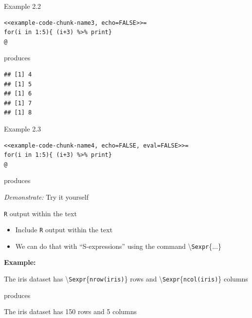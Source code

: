 \documentclass[10pt]{beamer}\usepackage[]{graphicx}\usepackage[]{color}
\makeatletter
\newenvironment{kframe}{%
 \def\at@end@of@kframe{}%
 \ifinner\ifhmode%
  \def\at@end@of@kframe{\end{minipage}}%
  \begin{minipage}{\columnwidth}%
 \fi\fi%
 \def\FrameCommand##1{\hskip\@totalleftmargin \hskip-\fboxsep
 \colorbox{shadecolor}{##1}\hskip-\fboxsep
     \hskip-\linewidth \hskip-\@totalleftmargin \hskip\columnwidth}%
 \MakeFramed {\advance\hsize-\width
   \@totalleftmargin\z@ \linewidth\hsize
   \@setminipage}}%
 {\par\unskip\endMakeFramed%
 \at@end@of@kframe}
\newenvironment{knitrout}{}{} %
\makeatother
\begin{document}
\begin{frame}[fragile]{Example 2.2}
\begin{knitrout}
\color{fgcolor}\begin{kframe}
\begin{verbatim}
<<example-code-chunk-name3, echo=FALSE>>=
for(i in 1:5){ (i+3) %>% print}
@
\end{verbatim}
\end{kframe}
\end{knitrout}
produces
\begin{knitrout}
\color{fgcolor}\begin{kframe}
\begin{verbatim}
## [1] 4
## [1] 5
## [1] 6
## [1] 7
## [1] 8
\end{verbatim}
\end{kframe}
\end{knitrout}

\end{frame}


\begin{frame}[fragile]{Example 2.3}
\begin{knitrout}
\color{fgcolor}\begin{kframe}
\begin{verbatim}
<<example-code-chunk-name4, echo=FALSE, eval=FALSE>>=
for(i in 1:5){ (i+3) %>% print}
@
\end{verbatim}
\end{kframe}
\end{knitrout}
produces


\textit{Demonstrate:} Try it yourself
\end{frame}



\begin{frame}[fragile]{\texttt{R} output within the text}
\begin{itemize}
\item Include \texttt{R} output within the text
\item We can do that with ``S-expressions'' using the command \textbackslash \texttt{Sexpr}\{$\ldots$\}
\end{itemize}
\vspace{1cm}

\textbf{Example:} \vspace{0.3cm}

The iris dataset has \textbackslash \texttt{Sexpr}\{\texttt{nrow(iris)}\} rows and \textbackslash \texttt{Sexpr}\{\texttt{ncol(iris)}\} columns
\vspace{0.5cm}

produces \vspace{0.5cm}

The iris dataset has 150 rows and 5 columns


\end{frame}
\end{document}
